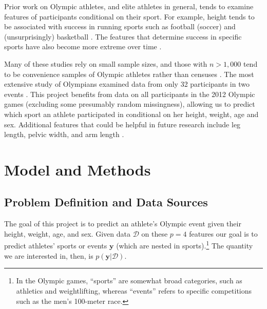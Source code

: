 \documentclass[12pt,letterpaper]{article} %
\begin{document}

Prior work on Olympic athletes, and elite athletes in general, tends to examine features of participants conditional on their sport. For example, height tends to be associated with success in running sports such as football (soccer) and (unsurprisingly) basketball \citep{reilly2000anthropometric,norton2001morphological}. The features that determine success in specific sports have also become more extreme over time \citep{norton2001morphological,willer2009six,lozovina2012morphological}.

Many of these studies rely on small sample sizes, and those with $n>1,000$ tend to be convenience samples of Olympic athletes rather than censuses \citep{de1974genetic}. The most extensive study of Olympians examined data from only 32 participants in two events \citep{khosla1985age}. This project benefits from data on all participants in the 2012 Olympic games (excluding some presumably random missingness), allowing us to predict which sport an athlete participated in conditional on her height, weight, age and sex. Additional features that could be helpful in future research include leg length, pelvic width, and arm length \citep{lohman2012current}. 

\section{Model and Methods}

\subsection{Problem Definition and Data Sources}

The goal of this project is to predict an athlete's Olympic event given their height, weight, age, and sex. Given data $\mathcal{D}$ on these $p=4$ features our goal is to predict athletes' sports or events $\mathbf{y}$ (which are nested in sports).\footnote{In the Olympic games, ``sports'' are somewhat broad categories, such as athletics and weightlifting, whereas ``events'' refers to specific competitions such as the men's 100-meter race.} The quantity we are interested in, then, is $p(\mathbf{y}|\mathcal{D})$.
\end{document}
